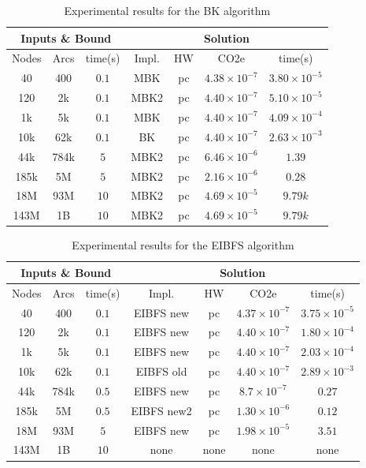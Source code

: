 \documentclass[a4paper,singleside,12pt]{report} %
\begin{document}
\begin{table}[h!]
    \centering
    \begin{tabular}{|ccc|cccc|}
        \hline
        \multicolumn{3}{|c|}{Inputs \& Bound} & \multicolumn{4}{c|}{Solution} \\
        \hline
        Nodes & Arcs & time(s) & Impl. & HW & CO2e & time(s) \\
        \hline
        40 & 400 & $0.1$ & MBK & pc & $4.38 \times 10^{-7}$ & $3.80 \times 10^{-5}$ \\
        120 & 2k & $0.1$ & MBK2 & pc & $4.40 \times 10^{-7}$ & $5.10 \times 10^{-5}$ \\
        1k & 5k & $0.1$ & MBK & pc & $4.40 \times 10^{-7}$ & $4.09 \times 10^{-4}$ \\
        10k & 62k & $0.1$ & BK & pc & $4.40 \times 10^{-7}$ & $2.63 \times 10^{-3}$ \\
        44k & 784k & $5$ & MBK2 & pc & $6.46 \times 10^{-6}$ & $1.39$ \\
        185k & 5M & $5$ & MBK2 & pc & $2.16 \times 10^{-6}$ & $0.28$ \\
        18M & 93M & $10$ & MBK2 & pc & $4.69 \times 10^{-5}$& $9.79k$ \\
        143M & 1B & $10$ & MBK2 & pc & $4.69 \times 10^{-5}$ & $9.79k$ \\
        \hline
    \end{tabular}
    \caption{Experimental results for the BK algorithm}
    \label{tab:bk_results}
\end{table}

\begin{table}[h!]
    \centering
    \begin{tabular}{|ccc|cccc|}
        \hline
        \multicolumn{3}{|c|}{Inputs \& Bound} & \multicolumn{4}{c|}{Solution} \\
        \hline
        Nodes & Arcs & time(s) & Impl. & HW & CO2e & time(s) \\
        \hline
        40 & 400 & $0.1$ & EIBFS new & pc & $4.37 \times 10^{-7}$ & $3.75 \times 10^{-5}$ \\
        120 & 2k & $0.1$ & EIBFS new & pc & $4.40 \times 10^{-7}$ & $1.80 \times 10^{-4}$ \\
        1k & 5k & $0.1$ & EIBFS new & pc & $4.40 \times 10^{-7}$ & $2.03 \times 10^{-4}$ \\
        10k & 62k & $0.1$ & EIBFS old & pc & $4.40 \times 10^{-7}$ & $2.89 \times 10^{-3}$ \\
        44k & 784k & $0.5$ & EIBFS new & pc & $8.7 \times 10^{-7}$ & $0.27$ \\
        185k & 5M & $0.5$ & EIBFS new2 & pc & $1.30 \times 10^{-6}$ & $0.12$ \\
        18M & 93M & $5$ & EIBFS new & pc & $1.98 \times 10^{-5}$& $3.51$ \\
        143M & 1B & $10$ & none & none & none & none \\
        \hline
    \end{tabular}
    \caption{Experimental results for the EIBFS algorithm}
    \label{tab:eibfs_results}
\end{table}
\end{document}
